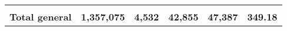 \begin{tabular}{lrcclr}
	& \multicolumn{1}{l}{}                                           & \multicolumn{1}{l}{}                                       & \multicolumn{1}{l}{} &                                                                     & \multicolumn{1}{l}{}                                                         \\
	\rowcolor[HTML]{DDEBF7} 
	\textbf{Total   general}                                       & \textbf{1,357,075}                                             & \multicolumn{1}{r}{\cellcolor[HTML]{DDEBF7}\textbf{4,532}} & \textbf{42,855}      & \textbf{47,387}                                                     & \textbf{349.18}                                                             
\end{tabular}